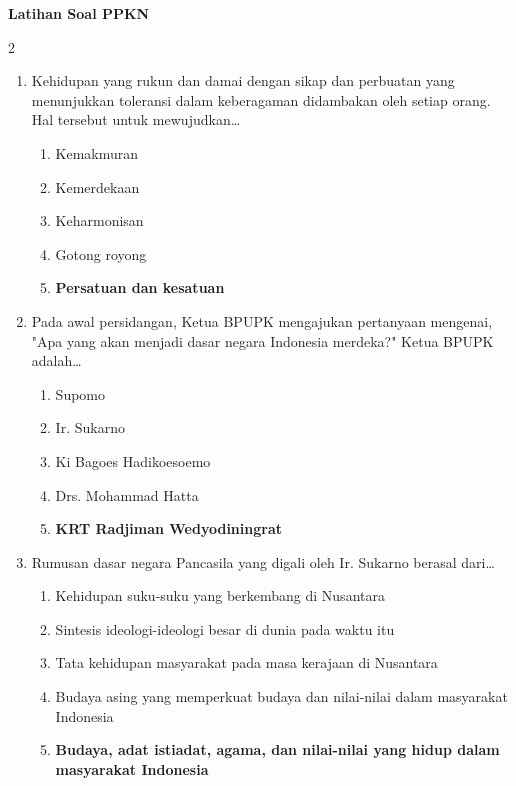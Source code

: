 \documentclass[10pt,a4paper]{article}
\begin{document}
\begin{center}
  \textbf{\Large Latihan Soal PPKN}
\end{center}
\vspace{0.3cm}

\begin{multicols}{2}

  \begin{enumerate}
  \item Kehidupan yang rukun dan damai dengan sikap dan perbuatan yang menunjukkan toleransi dalam keberagaman didambakan oleh setiap orang. Hal tersebut untuk mewujudkan\dots
    \begin{enumerate}
    \item Kemakmuran
    \item Kemerdekaan
    \item Keharmonisan
    \item Gotong royong
    \item \textbf{Persatuan dan kesatuan}
    \end{enumerate}

  \item Pada awal persidangan, Ketua BPUPK mengajukan pertanyaan mengenai, "Apa yang akan menjadi dasar negara Indonesia merdeka?" Ketua BPUPK adalah\dots
    \begin{enumerate}
    \item Supomo
    \item Ir. Sukarno
    \item Ki Bagoes Hadikoesoemo
    \item Drs. Mohammad Hatta
    \item \textbf{KRT Radjiman Wedyodiningrat}
    \end{enumerate}

  \item Rumusan dasar negara Pancasila yang digali oleh Ir. Sukarno berasal dari\dots
    \begin{enumerate}
    \item Kehidupan suku-suku yang berkembang di Nusantara
    \item Sintesis ideologi-ideologi besar di dunia pada waktu itu
    \item Tata kehidupan masyarakat pada masa kerajaan di Nusantara
    \item Budaya asing yang memperkuat budaya dan nilai-nilai dalam masyarakat Indonesia
    \item \textbf{Budaya, adat istiadat, agama, dan nilai-nilai yang hidup dalam masyarakat Indonesia}
    \end{enumerate}


\end{enumerate}
\end{multicols}
\end{document}

